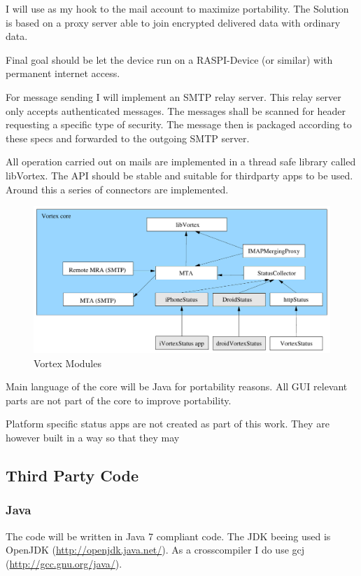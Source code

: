 I will use  as my hook to the mail account to maximize portability. The Solution is based on a  proxy server able to join encrypted delivered data with ordinary data.\par

Final goal should be let the device run on a RASPI-Device (or similar) with permanent internet access. \par

For message sending I will implement an SMTP relay server. This relay server only accepts authenticated messages. The messages shall be scanned for header requesting a specific type of security. The message then is packaged according to these specs and forwarded to the outgoing SMTP server.

All operation carried out on mails are implemented in a thread safe library called libVortex. The API should be stable and suitable for thirdparty apps to be used. Around this a series of connectors are implemented.

\begin{figure}[ht!]
  \centering\includegraphics[width=\textwidth]{inc/VortexModules}
  \caption{Vortex Modules}\label{fig:VortexModules}
\end{figure}

Main language of the core will be Java for portability reasons. All GUI relevant parts are not part of the core to improve portability.\par

Platform specific status apps are not created as part of this work. They are however built in a way so that they may

\subsection{Third Party Code}
\subsubsection{Java}
The code will be written in Java 7 compliant code. The JDK beeing used is OpenJDK (\url{http://openjdk.java.net/}). As a crosscompiler I do use gcj (\url{http://gcc.gnu.org/java/}).

